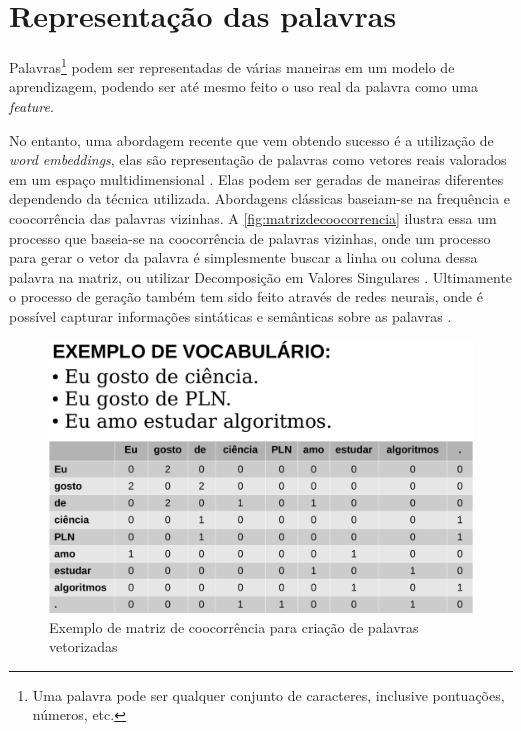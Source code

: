 \section{Representação das palavras}\label{sec:representacaodaspalavras}

Palavras\footnote{Uma palavra pode ser qualquer conjunto de caracteres, inclusive pontuações, números, etc.} podem ser representadas de várias maneiras em um modelo de aprendizagem, podendo ser até mesmo feito o uso real da palavra como uma \textit{feature}.

No entanto, uma abordagem recente que vem obtendo sucesso é a utilização de \textit{word embeddings}, elas são representação de palavras como vetores reais valorados em um espaço multidimensional \cite{turian2010word}. Elas podem ser geradas de maneiras diferentes dependendo da técnica utilizada. Abordagens clássicas baseiam-se na frequência e coocorrência das palavras vizinhas. A \autoref{fig:matrizdecoocorrencia} ilustra essa um processo que baseia-se na coocorrência de palavras vizinhas, onde um processo para gerar o vetor da palavra é simplesmente buscar a linha ou coluna dessa palavra na matriz, ou utilizar Decomposição em Valores Singulares \cite{deeplearningfornlp}. Ultimamente o processo de geração também tem sido feito através de redes neurais, onde é possível capturar informações sintáticas e semânticas sobre as palavras \cite{collobert2011natural}.

\begin{figure}[htb]
  \caption{Exemplo de matriz de coocorrência para criação de palavras vetorizadas} \label{fig:matrizdecoocorrencia}
  \begin{center}
      \includegraphics[scale=0.5]{img/matrizdecoocorrencia.pdf}
  \end{center}
\end{figure}



